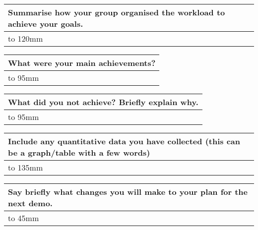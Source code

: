 \documentclass[a4paper]{article}
\newcommand{\colWidth}{141mm}
\begin{document}
\begin{center}
\begin{tabular}{|p{\colWidth}|}
	\hline
\end{tabular}
\vskip 5mm


\begin{tabular}{|p{\colWidth}|}
	\hline
	\cellcolor{blue!25}\large
	\textbf{Summarise how your group organised the workload to achieve your goals.}
	\\ \hline
	\vtop to 120mm{
		}
  \\
  \hline
\end{tabular}
\vskip 5mm


\begin{tabular}{|p{\colWidth}|}
	\hline
	\cellcolor{blue!25}\large
	\textbf{What were your main achievements?}
	\\ \hline
	\vtop to 95mm{
	
	}
  \\
  \hline
\end{tabular}
\vskip 5mm


\begin{tabular}{|p{\colWidth}|}
	\hline
	\cellcolor{blue!25}\large
	\textbf{What did you not achieve? Briefly explain why.}
	\\ \hline
	\vtop to 95mm{

  }
  \\
  \hline
\end{tabular}
\vskip 5mm


\begin{tabular}{|p{\colWidth}|}
	\hline
	\cellcolor{blue!25}\large
	\textbf{Include any quantitative data you have collected (this can be a graph/table with a few words)}
	\\ \hline
	\vtop to 135mm{
  }
  \\
  \hline
\end{tabular}
\vskip 5mm


\begin{tabular}{|p{\colWidth}|}
	\hline
	\cellcolor{blue!25}\large
	\textbf{Say briefly what changes you will make to your plan for the next demo.}
	\\ \hline
	\vtop to 45mm{
  	}
  \\
  \hline
\end{tabular}

\end{center}
  
\end{document}
